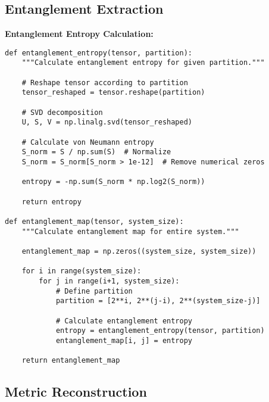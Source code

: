 \documentclass[11pt]{article}
\theoremstyle{definition}
\begin{document}
\subsection{Entanglement Extraction}

\textbf{Entanglement Entropy Calculation:}
\begin{verbatim}
def entanglement_entropy(tensor, partition):
    """Calculate entanglement entropy for given partition."""
    
    # Reshape tensor according to partition
    tensor_reshaped = tensor.reshape(partition)
    
    # SVD decomposition
    U, S, V = np.linalg.svd(tensor_reshaped)
    
    # Calculate von Neumann entropy
    S_norm = S / np.sum(S)  # Normalize
    S_norm = S_norm[S_norm > 1e-12]  # Remove numerical zeros
    
    entropy = -np.sum(S_norm * np.log2(S_norm))
    
    return entropy

def entanglement_map(tensor, system_size):
    """Calculate entanglement map for entire system."""
    
    entanglement_map = np.zeros((system_size, system_size))
    
    for i in range(system_size):
        for j in range(i+1, system_size):
            # Define partition
            partition = [2**i, 2**(j-i), 2**(system_size-j)]
            
            # Calculate entanglement entropy
            entropy = entanglement_entropy(tensor, partition)
            entanglement_map[i, j] = entropy
    
    return entanglement_map
\end{verbatim}

\subsection{Metric Reconstruction}
\end{document}
